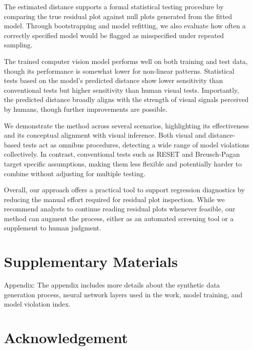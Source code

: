 \documentclass[]{interact}
\theoremstyle{plain}%
\theoremstyle{definition}
\theoremstyle{remark}
\begin{document}
The estimated distance supports a formal statistical testing procedure
by comparing the true residual plot against null plots generated from
the fitted model. Through bootstrapping and model refitting, we also
evaluate how often a correctly specified model would be flagged as
misspecified under repeated sampling.

The trained computer vision model performs well on both training and
test data, though its performance is somewhat lower for non-linear
patterns. Statistical tests based on the model's predicted distance show
lower sensitivity than conventional tests but higher sensitivity than
human visual tests. Importantly, the predicted distance broadly aligns
with the strength of visual signals perceived by humans, though further
improvements are possible.

We demonstrate the method across several scenarios, highlighting its
effectiveness and its conceptual alignment with visual inference. Both
visual and distance-based tests act as omnibus procedures, detecting a
wide range of model violations collectively. In contrast, conventional
tests such as RESET and Breusch-Pagan target specific assumptions,
making them less flexible and potentially harder to combine without
adjusting for multiple testing.

Overall, our approach offers a practical tool to support regression
diagnostics by reducing the manual effort required for residual plot
inspection. While we recommend analysts to continue reading residual
plots whenever feasible, our method can augment the process, either as
an automated screening tool or a supplement to human judgment.

\section*{Supplementary Materials}\label{supplementary-materials}

\begin{description}
\item{Appendix:} The appendix includes more details about the synthetic data generation process, neural network layers used in the work, model training, and model violation index. 
\end{description}

\section*{Acknowledgement}\label{acknowledgement}
\end{document}
